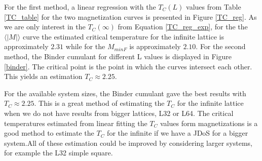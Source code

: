 	For the first method, a linear regression with the $T_C(L)$ values from Table \ref{TC_table} for the two magnetization curves is presented in Figure \ref{TC_reg}. As we are only interest in the $T_C(\infty)$ from Equation \ref{TC_reg_exp}, for the the $\langle |M| \rangle$ curve the estimated critical temperature for the infinite lattice is approximately $2.31$ while for the $M_{minF}$ is approximately $2.10$. 
	For the second method, the Binder cumulant for different L values is displayed in Figure \ref{binder}. The critical point is the point in which the curves intersect each other. This yields an estimation $T_C \approx 2.25$.
	
	For the available system sizes, the Binder cumulant gave the best results with $T_C \approx 2.25$. This is a great method of estimating the $T_C$ for the infinite lattice when we do not have results from bigger lattices, L32 or L64. The critical temperatures estimated from linear fitting the $T_C$ values form magnetizations is a good method to estimate the $T_C$ for the infinite if we have a JDoS for a bigger system.All of these estimation could be improved by considering larger systems, for example the L32 simple square.








